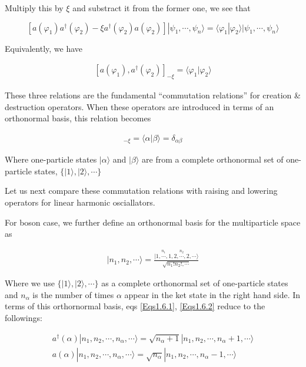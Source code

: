 Multiply this by $\xi$ and substract it from the former one, we see that

\[[a(\varphi_1)a^\dagger(\varphi_2) - \xi a^\dagger(\varphi_2)a(\varphi_2)]|\psi_1,\cdots,\psi_n\rangle = \langle \varphi_1|\varphi_2\rangle |\psi_1,\cdots,\psi_n\rangle \]

Equivalently, we have

\begin{align}\label{eqs1.6.5}
[a(\varphi_1),a^\dagger(\varphi_2)] _{-\xi} = \langle\varphi_1|\varphi_2\rangle
\end{align}

These three relations are the fundamental ``commutation relations'' for creation \& destruction operators. When these operators are introduced in terms of an orthonormal basis, this relation becomes

\begin{align}
[a(\alpha),a^\dagger(\beta)]_{-\xi} = \langle\alpha|\beta\rangle = \delta_{\alpha\beta}
\end{align}

Where one-particle states $|\alpha\rangle$ and $|\beta\rangle$ are from a complete orthonormal set of one-particle states, $\{|1\rangle,|2\rangle,\cdots\}$

Let us next compare these commutation relations with raising and lowering operators for linear harmonic osciallators. 

For boson case, we further define an orthonormal basis for the multiparticle space as 

\begin{align}|n_1,n_2,\cdots\rangle = \frac{|\overset{n_1}{1,\cdots,1},\overset{n_2}{2,\cdots,2},\cdots\rangle}{\sqrt{n_1! n_2!,\cdots}} \end{align}

Where we use $\{|1\rangle,|2\rangle,\cdots\}$ as a complete orthonormal set of one-particle states and $n_{\alpha}$ is the number of times $\alpha$ appear in the ket state in the right hand side. In terms of this orthornormal basis, eqs \eqref{Eqs1.6.1}, \eqref{Eqs1.6.2} reduce to the followings:

\begin{align}
a^\dagger(\alpha)|n_1,n_2,\cdots,n_{\alpha},\cdots\rangle = \sqrt{n_\alpha+1}|n_1,n_2,\cdots,n_{\alpha}+1,\cdots\rangle\\
a(\alpha)|n_1,n_2,\cdots,n_{\alpha},\cdots\rangle = \sqrt{n_\alpha}|n_1,n_2,\cdots,n_{\alpha}-1,\cdots\rangle
\end{align}

